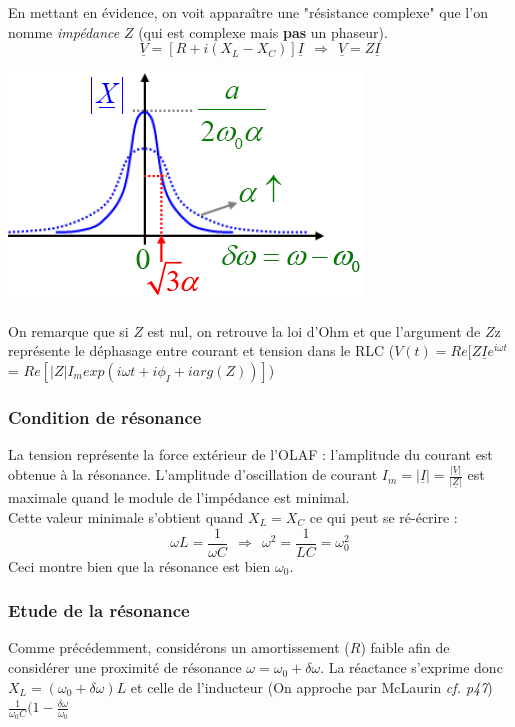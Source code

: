 \documentclass	[11pt, a4paper, openany]{book}
\begin{document}
En mettant en évidence, on voit apparaître une "résistance complexe" que l'on nomme \textit{impédance} $Z$ (qui est complexe mais \textbf{pas} un phaseur).
\begin{equation}
\underline{V} = \left[R + i\left(X_L - X_C\right)\right]\underline{I}\ \ \Rightarrow\ \ \underline{V} = Z\underline{I}
\end{equation}
\begin{center}
\includegraphics[scale=0.5]{oo/image18.png}
\end{center}
On remarque que si $Z$ est nul, on retrouve la loi d'Ohm et que l'argument de $Z$z représente le déphasage entre courant et tension dans le RLC ($V(t) = Re[Z\underline{I}e^{i\omega t}$ = $Re[|Z|I_m exp(i\omega t + i\phi_I + i arg(Z))]$)

\subsubsection{Condition de résonance}
La tension représente la force extérieur de l'OLAF : l'amplitude du courant est obtenue à la résonance. L'amplitude d'oscillation de courant $I_m = |\underline{I}| = \frac{|\underline{V}|}{|\underline{Z}|}$ est maximale quand le module de l'impédance est minimal.\\
Cette valeur minimale s'obtient quand $X_L = X_C$ ce qui peut se ré-écrire :
\begin{equation}
\omega L = \frac{1}{\omega C}\ \ \Rightarrow\ \ \omega^2 = \frac{1}{LC} = \omega_0^2
\end{equation}
Ceci montre bien que la résonance est bien $\omega_0$.

\subsubsection{Etude de la résonance}
Comme précédemment, considérons un amortissement ($R$) faible afin de considérer une proximité de résonance $\omega = \omega_0 + \delta\omega$. La réactance s'exprime donc $X_L = (\omega_0 + \delta\omega)L$ et celle de l'inducteur (On approche par McLaurin \textit{cf. p47}) $\frac{1}{\omega_0 C}(1-\frac{\delta\omega}{\omega_0}$\\
\end{document}
